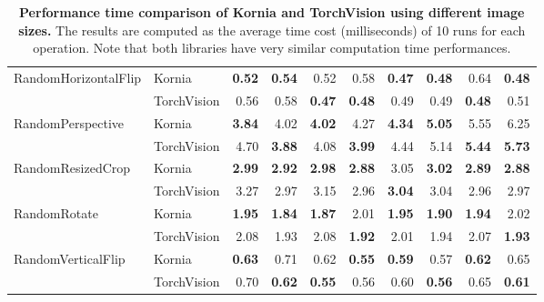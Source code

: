 \begin{table}[!ht]
{\begin{tabular}{llrrrrrrrr}
\midrule
RandomHorizontalFlip & Kornia &   \bfseries0.52 &   \bfseries0.54 &   0.52 &   0.58 &   \bfseries0.47 &   \bfseries0.48 &   0.64 &   \bfseries0.48 \\
                   & TorchVision &   0.56 &   0.58 &   \bfseries0.47 &   \bfseries0.48 &   0.49 &   0.49 &   \bfseries0.48 &   0.51 \\
\midrule
RandomPerspective & Kornia &   \bfseries3.84 &   4.02 &   \bfseries4.02 &   4.27 &   \bfseries4.34 &   \bfseries5.05 &   5.55 &   6.25 \\
                   & TorchVision &   4.70 &   \bfseries3.88 &   4.08 &   \bfseries3.99 &   4.44 &   5.14 &   \bfseries5.44 &   \bfseries5.73 \\
\midrule
RandomResizedCrop & Kornia &   \bfseries2.99 &   \bfseries2.92 &   \bfseries2.98 &   \bfseries2.88 &   3.05 &   \bfseries3.02 &   \bfseries2.89 &   \bfseries2.88 \\
                   & TorchVision &   3.27 &   2.97 &   3.15 &   2.96 &   \bfseries3.04 &   3.04 &   2.96 &   2.97 \\
\midrule
RandomRotate & Kornia &   \bfseries1.95 &   \bfseries1.84 &   \bfseries1.87 &   2.01 &   \bfseries1.95 &   \bfseries1.90 &   \bfseries1.94 &   2.02 \\
                   & TorchVision &   2.08 &   1.93 &   2.08 &   \bfseries1.92 &   2.01 &   1.94 &   2.07 &   \bfseries1.93 \\
\midrule
RandomVerticalFlip & Kornia &   \bfseries0.63 &   0.71 &   0.62 &  \bfseries 0.55 &   \bfseries0.59 &   0.57 &   \bfseries0.62 &   0.65 \\
                   & TorchVision &   0.70 &   \bfseries0.62 &   \bfseries0.55 &   0.56 &   0.60 &   \bfseries0.56 &   0.65 &   \bfseries0.61 \\
\bottomrule
\end{tabular}}
\vspace{.5cm}
\caption[Performance time comparison of Kornia and TorchVision using different image sizes]{{\bf Performance time comparison of Kornia and TorchVision using different image sizes.} The results are computed as the average time cost (milliseconds) of 10 runs for each operation. Note that  both libraries have very similar computation time performances.}
\label{tab:op_kornia_vs_torchvision}
\end{table}

